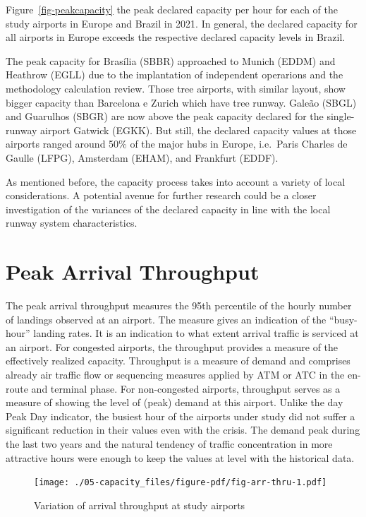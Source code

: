 \documentclass[
  a4paper,
  DIV=11,
  numbers=noendperiod]{scrreprt}
\begin{document}
Figure~\ref{fig-peakcapacity} the peak declared capacity per hour for
each of the study airports in Europe and Brazil in 2021. In general, the
declared capacity for all airports in Europe exceeds the respective
declared capacity levels in Brazil.

The peak capacity for Brasília (SBBR) approached to Munich (EDDM) and
Heathrow (EGLL) due to the implantation of independent operarions and
the methodology calculation review. Those tree airports, with similar
layout, show bigger capacity than Barcelona e Zurich which have tree
runway. Galeão (SBGL) and Guarulhos (SBGR) are now above the peak
capacity declared for the single-runway airport Gatwick (EGKK). But
still, the declared capacity values at those airports ranged around 50\%
of the major hubs in Europe, i.e.~Paris Charles de Gaulle (LFPG),
Amsterdam (EHAM), and Frankfurt (EDDF).

As mentioned before, the capacity process takes into account a variety
of local considerations. A potential avenue for further research could
be a closer investigation of the variances of the declared capacity in
line with the local runway system characteristics.

\hypertarget{peak-arrival-throughput}{%
\section{Peak Arrival Throughput}\label{peak-arrival-throughput}}

The peak arrival throughput measures the 95th percentile of the hourly
number of landings observed at an airport. The measure gives an
indication of the ``busy-hour'' landing rates. It is an indication to
what extent arrival traffic is serviced at an airport. For congested
airports, the throughput provides a measure of the effectively realized
capacity. Throughput is a measure of demand and comprises already air
traffic flow or sequencing measures applied by ATM or ATC in the
en-route and terminal phase. For non-congested airports, throughput
serves as a measure of showing the level of (peak) demand at this
airport. Unlike the day Peak Day indicator, the busiest hour of the
airports under study did not suffer a significant reduction in their
values even with the crisis. The demand peak during the last two years
and the natural tendency of traffic concentration in more attractive
hours were enough to keep the values at level with the historical data.

\begin{figure}[h]

{\centering \texttt{[image: ./05-capacity\_files/figure-pdf/fig-arr-thru-1.pdf]}

}

\caption{\label{fig-arr-thru}Variation of arrival throughput at study
airports}

\end{figure}
\end{document}
